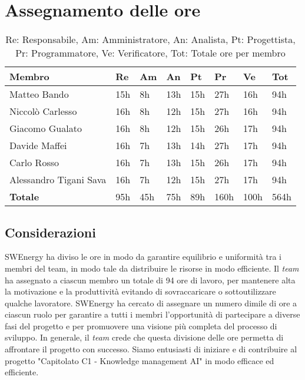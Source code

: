 \section{Assegnamento delle ore}

\begin{table}[H]
	\renewcommand{\arraystretch}{1.5}
	\centering
	\begin{tabular}{l|l|l|l|l|l|l|l}
		\textbf{Membro} & \textbf{Re} & \textbf{Am} & \textbf{An} & \textbf{Pt}
		& \textbf{Pr} & \textbf{Ve} & \textbf{Tot} \\
		\toprule
		 Matteo Bando &				15h & 8h & 13h  & 15h & 27h  & 16h  & 94h \\
		 Niccolò Carlesso &			16h & 8h & 12h	& 15h & 27h  & 16h  & 94h \\
		 Giacomo Gualato &			16h & 8h & 12h	& 15h & 26h  & 17h  & 94h \\
		 Davide Maffei	&			16h & 7h & 13h	& 14h & 27h  & 17h  & 94h \\
		 Carlo Rosso &				16h & 7h & 13h	& 15h & 26h  & 17h  & 94h \\
		 Alessandro Tigani Sava &	16h & 7h & 12h	& 15h & 27h  & 17h  & 94h \\
		 \midrule
		 \textbf{Totale} &			95h & 45h & 75h & 89h & 160h & 100h & 564h \\
	\end{tabular}

	\caption{Re: Responsabile, Am: Amministratore, An: Analista, Pt:
	Progettista, Pr: Programmatore, Ve: Verificatore, Tot: Totale ore per 
	membro}
\end{table}

\subsection{Considerazioni}

SWEnergy ha diviso le ore in modo da garantire equilibrio e uniformità tra i
membri del team, in modo tale da distribuire le risorse in modo efficiente.
Il \textit{team} ha assegnato a ciascun membro un totale di 94 ore di lavoro,
per mantenere alta la motivazione e la produttività evitando di sovraccaricare o
sottoutilizzare qualche lavoratore.
SWEnergy ha cercato di assegnare un numero dimile di ore a ciascun ruolo per
garantire a tutti i membri l'opportunità di partecipare a diverse fasi del
progetto e per promuovere una visione più completa del processo di sviluppo.
In generale, il \textit{team} crede che questa divisione delle ore permetta di
affrontare il progetto con successo. Siamo entusiasti di iniziare e di
contribuire al progetto "Capitolato C1 - Knowledge management AI" in modo
efficace ed efficiente.
